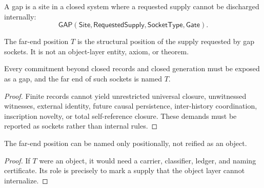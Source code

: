 \begin{definition}[Gap]
\label{def:philosophy-gap-total}
A gap is a site in a closed system where a requested supply cannot be
discharged internally:
$$
\mathsf{GAP}(\mathsf{Site},\mathsf{RequestedSupply},
\mathsf{SocketType},\mathsf{Gate}).
$$
\end{definition}

\begin{definition}
\label{def:philosophy-far-end-position-total}
The far-end position \(T\) is the structural position of the supply
requested by gap sockets. It is not an object-layer entity, axiom, or
theorem.
\end{definition}

\begin{theorem}
\label{thm:philosophy-gap-far-end-synthesis-total}
Every commitment beyond closed records and closed generation must be
exposed as a gap, and the far end of such sockets is named \(T\).
\end{theorem}
\begin{proof}
Finite records cannot yield unrestricted universal closure, unwitnessed
witnesses, external identity, future causal persistence, inter-history
coordination, inscription novelty, or total self-reference closure.
These demands must be reported as sockets rather than internal rules.
\end{proof}

\begin{corollary}
\label{cor:philosophy-far-end-not-object-total}
The far-end position can be named only positionally, not reified as an
object.
\end{corollary}
\begin{proof}
If \(T\) were an object, it would need a carrier, classifier, ledger,
and naming certificate. Its role is precisely to mark a supply that the
object layer cannot internalize.
\end{proof}
